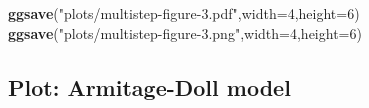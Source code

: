 \documentclass[
]{article}
\newenvironment{Shaded}{\begin{snugshade}}{\end{snugshade}}
\newcommand{\DataTypeTok}[1]{\textcolor[rgb]{0.13,0.29,0.53}{#1}}
\newcommand{\DecValTok}[1]{\textcolor[rgb]{0.00,0.00,0.81}{#1}}
\newcommand{\KeywordTok}[1]{\textcolor[rgb]{0.13,0.29,0.53}{\textbf{#1}}}
\newcommand{\NormalTok}[1]{#1}
\newcommand{\StringTok}[1]{\textcolor[rgb]{0.31,0.60,0.02}{#1}}
\begin{document}
\begin{Shaded}
\begin{Highlighting}[]
\KeywordTok{ggsave}\NormalTok{(}\StringTok{"plots/multistep-figure-3.pdf"}\NormalTok{,}\DataTypeTok{width=}\DecValTok{4}\NormalTok{,}\DataTypeTok{height=}\DecValTok{6}\NormalTok{)}
\KeywordTok{ggsave}\NormalTok{(}\StringTok{"plots/multistep-figure-3.png"}\NormalTok{,}\DataTypeTok{width=}\DecValTok{4}\NormalTok{,}\DataTypeTok{height=}\DecValTok{6}\NormalTok{)}
\end{Highlighting}
\end{Shaded}

\hypertarget{plot-armitage-doll-model}{%
\subsection{Plot: Armitage-Doll model}\label{plot-armitage-doll-model}}
\end{document}

